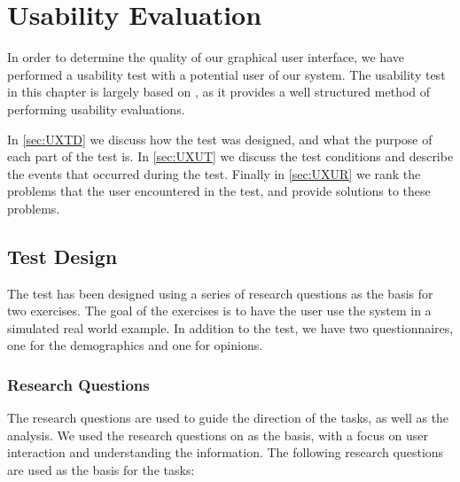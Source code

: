 \chapter{Usability Evaluation}\label{cha:usability}

In order to determine the quality of our graphical user interface, we have
performed a usability test with a potential user of our system. The usability
test in this chapter is largely based on \citep[p. 65-72 and 269-275]{UXBook},
as it provides a well structured method of performing usability evaluations.\nl

In \autoref{sec:UXTD} we discuss how the test was designed, and what the purpose
of each part of the test is. In \autoref{sec:UXUT} we discuss the test
conditions and describe the events that occurred during the test.
Finally in \autoref{sec:UXUR} we rank the problems that the user encountered in
the test, and provide solutions to these problems.

\section{Test Design}\label{sec:UXTD}
The test has been designed using a series of research questions as the basis
for two exercises. The goal of the exercises is to have the user use the
system in a simulated real world example. In addition to the test, we have two
questionnaires, one for the demographics and one for opinions.

\subsection{Research Questions}\label{subsec:UXRQ}
The research questions are used to guide the direction of the tasks, as well as
the analysis. We used the research questions on \citep[p. 70-71]{UXBook} as the
basis, with a focus on user interaction and understanding the information.
The following research questions are used as the basis for the tasks:

